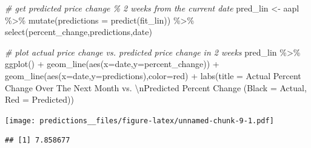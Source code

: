 \documentclass[
]{article}
\newenvironment{Shaded}{\begin{snugshade}}{\end{snugshade}}
\newcommand{\AttributeTok}[1]{\textcolor[rgb]{0.77,0.63,0.00}{#1}}
\newcommand{\CommentTok}[1]{\textcolor[rgb]{0.56,0.35,0.01}{\textit{#1}}}
\newcommand{\FunctionTok}[1]{\textcolor[rgb]{0.00,0.00,0.00}{#1}}
\newcommand{\NormalTok}[1]{#1}
\newcommand{\OtherTok}[1]{\textcolor[rgb]{0.56,0.35,0.01}{#1}}
\newcommand{\SpecialCharTok}[1]{\textcolor[rgb]{0.00,0.00,0.00}{#1}}
\newcommand{\StringTok}[1]{\textcolor[rgb]{0.31,0.60,0.02}{#1}}
\begin{document}
\begin{Shaded}
\begin{Highlighting}[]
\CommentTok{\# get predicted price change \% 2 weeks from the current date}
\NormalTok{pred\_lin }\OtherTok{\textless{}{-}}\NormalTok{ aapl }\SpecialCharTok{\%\textgreater{}\%}
  \FunctionTok{mutate}\NormalTok{(}\AttributeTok{predictions =} \FunctionTok{predict}\NormalTok{(fit\_lin)) }\SpecialCharTok{\%\textgreater{}\%}
  \FunctionTok{select}\NormalTok{(percent\_change,predictions,date)}

\CommentTok{\# plot actual price change vs. predicted price change in 2 weeks }
\NormalTok{pred\_lin }\SpecialCharTok{\%\textgreater{}\%} 
  \FunctionTok{ggplot}\NormalTok{() }\SpecialCharTok{+}
  \FunctionTok{geom\_line}\NormalTok{(}\FunctionTok{aes}\NormalTok{(}\AttributeTok{x=}\NormalTok{date,}\AttributeTok{y=}\NormalTok{percent\_change)) }\SpecialCharTok{+}
  \FunctionTok{geom\_line}\NormalTok{(}\FunctionTok{aes}\NormalTok{(}\AttributeTok{x=}\NormalTok{date,}\AttributeTok{y=}\NormalTok{predictions),}\AttributeTok{color=}\StringTok{\textquotesingle{}red\textquotesingle{}}\NormalTok{) }\SpecialCharTok{+}
  \FunctionTok{labs}\NormalTok{(}\AttributeTok{title =} \StringTok{\textquotesingle{}Actual Percent Change Over The Next Month vs. }\SpecialCharTok{\textbackslash{}n}\StringTok{Predicted Percent Change (Black = Actual, Red = Predicted)\textquotesingle{}}\NormalTok{)}
\end{Highlighting}
\end{Shaded}

\texttt{[image: predictions\_\_files/figure-latex/unnamed-chunk-9-1.pdf]}

\begin{Shaded}
\end{Shaded}

\begin{verbatim}
## [1] 7.858677
\end{verbatim}

\begin{Shaded}
\end{Shaded}
\end{document}

